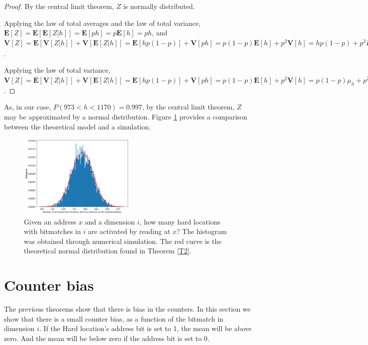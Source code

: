 \begin{proof}
By the central limit theorem, $Z$ is normally distributed.

Applying the law of total averages and the law of total variance, $\mathbf{E}[Z] = \mathbf{E}[\mathbf{E}[Z | h]] = \mathbf{E}[ph] = p \mathbf{E}[h] = ph$, and $\mathbf{V}[Z] = \mathbf{E}[\mathbf{V}[Z|h]] + \mathbf{V}[\mathbf{E}[Z|h]] = \mathbf{E}[hp(1-p)] + \mathbf{V}[ph] = p(1-p) \mathbf{E}[h] + p^2 \mathbf{V}[h] = hp(1-p) + p^2 H p_1 (1-p_1)$.

Applying the law of total variance, $\mathbf{V}[Z] = \mathbf{E}[\mathbf{V}[Z|h]] + \mathbf{V}[\mathbf{E}[Z|h]] = \mathbf{E}[hp(1-p)] + \mathbf{V}[ph] = p(1-p) \mathbf{E}[h] + p^2 \mathbf{V}[h] = p(1-p)\mu_h + p^2 \sigma^2_h$.
\end{proof}
As, in our case, $P(973 < h < 1170) = 0.997$, by the central limit theorem, $Z$ may be approximated by a normal distribution.  Figure \ref{fig:sdm-same-bit-histogram} provides a comparison between the theoretical model and a simulation.

\begin{figure}[h!]
  \centering
  \includegraphics[width=0.5\textwidth]{./images02/autocorrelation/same-bit-histogram.png}

  \caption{Given an address $x$ and a dimension $i$, how many hard locations with bitmatches in $i$ are activated by reading at $x$?  The histogram was obtained through numerical simulation. The red curve is the theoretical normal distribution found in Theorem \ref{T2}.}
  \label{fig:sdm-same-bit-histogram}
\end{figure}

\section{Counter bias}

The previous theorems show that there is bias in the counters. In this section we show that there is a small counter bias, as a function of the bitmatch in dimension $i$. If the Hard location's address bit is set to 1, the mean will be above zero.  And the mean will be below zero if the address bit is set to 0.

